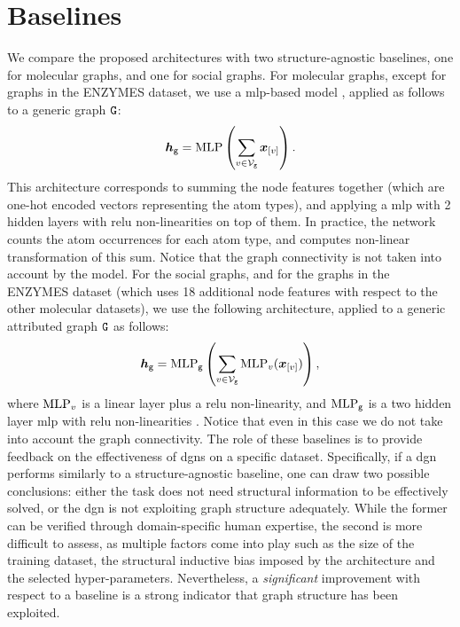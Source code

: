\section{Baselines}\label{sec:gnn-baselines}
We compare the proposed architectures with two structure-agnostic baselines, one for molecular graphs, and one for social graphs. For molecular graphs, except for graphs in the ENZYMES dataset, we use a \gls{mlp}-based model \citep{ralaivola2005graphkernels}, applied as follows to a generic graph $\AttrGraph{g}$:
$$\GraphRepr{g} = \Fun{MLP}\Par{\sum_{v \in \Nodes{g}} \Elem{x}{v}}.$$
This architecture corresponds to summing the node features together (which are one-hot encoded vectors representing the atom types), and applying a \gls{mlp} with 2 hidden layers with \gls{relu} non-linearities on top of them. In practice, the network counts the atom occurrences for each atom type, and computes non-linear transformation of this sum. Notice that the graph connectivity is not taken into account by the model.
For the social graphs, and for the graphs in the ENZYMES dataset (which uses 18 additional node features with respect to the other molecular datasets), we use the following architecture, applied to a generic attributed graph $\AttrGraph{g}$ as follows:
$$\GraphRepr{g} = \Fun{MLP}_{\Graph{g}}\Par{\sum_{v \in \Nodes{g}} \Fun{MLP}_v(\Elem{x}{v})},$$
where $\mathrm{MLP}_{v}$ is a linear layer plus a \gls{relu} non-linearity, and $\mathrm{MLP}_{\mathtt{g}}$ is a two hidden layer \gls{mlp} with \gls{relu} non-linearities \citep{zaheer2017deepsets}. Notice that even in this case we do not take into account the graph connectivity. The role of these baselines is to provide feedback on the effectiveness of \glspl{dgn} on a specific dataset. Specifically, if a \gls{dgn} performs similarly to a structure-agnostic baseline, one can draw two possible conclusions: either the task does not need structural information to be effectively solved, or the \gls{dgn} is not exploiting graph structure adequately. While the former can be verified through domain-specific human expertise, the second is more difficult to assess, as multiple factors come into play such as the size of the training dataset, the structural inductive bias imposed by the architecture and the selected hyper-parameters. Nevertheless, a \emph{significant} improvement with respect to a baseline is a strong indicator that graph structure has been exploited.


